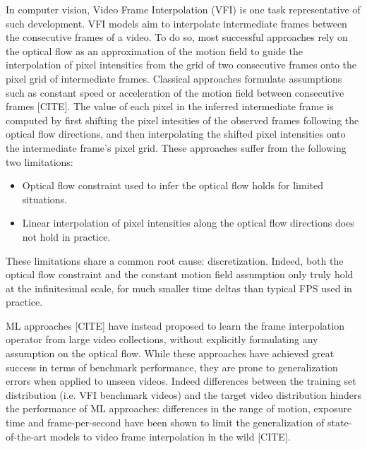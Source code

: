\documentclass{article}
\begin{document}
In computer vision, Video Frame Interpolation (VFI) is one task representative of such development.
VFI models aim to interpolate intermediate frames between the consecutive frames of a video.
To do so, most successful approaches rely on the optical flow as an approximation of the motion field
to guide the interpolation of pixel intensities from the grid of two consecutive frames onto the pixel grid of intermediate frames.
Classical approaches formulate assumptions such as constant speed or acceleration of the motion field between consecutive frames [CITE].
The value of each pixel in the inferred intermediate frame is computed by first shifting the pixel intesities of the observed frames following the
optical flow directions, and then interpolating the shifted pixel intensities onto the intermediate frame's pixel grid.
These approaches suffer from the following two limitations:

\begin{itemize}
\item Optical flow constraint used to infer the optical flow holds for limited situations. %
\item Linear interpolation of pixel intensities along the optical flow directions does not hold in practice. %
\end{itemize}

These limitations share a common root cause: discretization.
Indeed, both the optical flow constraint and the constant motion field assumption only truly hold at the infinitesimal scale,
for much smaller time deltas than typical FPS used in practice.

ML approaches [CITE] have instead proposed to learn the frame interpolation operator from large video collections,
without explicitly formulating any assumption on the optical flow.
While these approaches have achieved great success in terms of benchmark performance,
they are prone to generalization errors when applied to unseen videos. %
Indeed differences between the training set distribution (i.e. VFI benchmark videos) and the target video distribution hinders the performance of ML approaches:
differences in the range of motion, exposure time and frame-per-second have been shown to limit the
generalization of state-of-the-art models to video frame interpolation in the wild [CITE]. %
\end{document}
